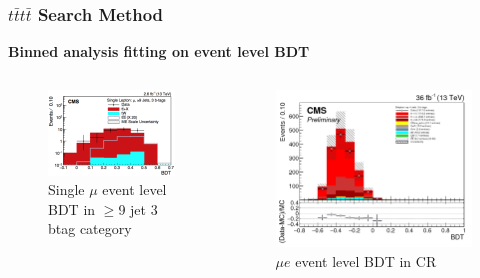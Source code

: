 \documentclass{beamer}
\begin{document}

\begin{frame}
\frametitle{$t\bar{t}t\bar{t}$ Search Method}
\textbf{Binned analysis fitting on event level BDT}
\begin{columns}
	 \center
	\begin{figure}
		\includegraphics[scale=0.2]{semilepbdt.png}
		\caption{Single $\mu$ event level BDT in $\geq$9 jet 3 btag category}
	\end{figure}
	 \center
	\begin{figure}
		\includegraphics[scale=0.12]{dilepbdt.png}
		\caption{$\mu e$ event level BDT in CR}
	\end{figure}

\end{columns}
\end{frame}
\end{document}
